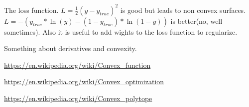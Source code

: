 \documentclass[a4paper,12pt]{article}
\begin{document}
\par The loss function. $L=\frac{1}{2}(y - y_{true})^2$ is good but leads to non convex surfaces. $L=-(y_{true} * \ln(y) - (1-y_{true}) * \ln(1-y))$ is better(no, well sometimes). Also it is useful to add wights to the loss function to regularize.

\par Something about derivatives and convexity.
\begin{list}{•}{}
\item \url{https://en.wikipedia.org/wiki/Convex_function}
\item \url{https://en.wikipedia.org/wiki/Convex_optimization}
\item \url{https://en.wikipedia.org/wiki/Convex_polytope}
\end{list}
\end{document}
